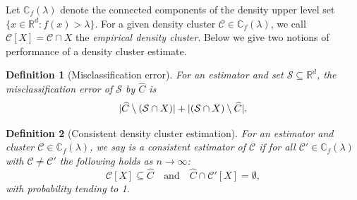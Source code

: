 \documentclass{article}
\DeclarePairedDelimiter\abs{\lvert}{\rvert}
\newcommand{\Reals}{\mathbb{R}}
\newcommand{\Rd}{\Reals^d}
\newcommand{\1}{\mathbf{1}}
\newcommand{\Xbf}{X}             %
\newcommand{\Cbb}{\mathbb{C}}
\newcommand{\Cset}{\mathcal{C}}
\newcommand{\Cest}{\widehat{C}}
\theoremstyle{aldenthm}
\newtheorem{definition}{Definition}
\theoremstyle{aldenrmrk}
\begin{document}



Let $\Cbb_f(\lambda)$ denote the connected components of the density upper level
set $\{x \in \Rd: f(x) > \lambda\}$.  For a given density cluster $\Cset \in
\Cbb_f(\lambda)$, we call $\Cset[\Xbf] = \Cset \cap \Xbf$ the \emph{empirical
density cluster}. Below we give two notions of performance of a density cluster estimate. 

\begin{definition}[Misclassification error]
\label{def: misclassification_rate}
For an estimator \smash{$\Cest \subseteq \Xbf$} and set
$\mathcal{S} \subseteq \Reals^d$, the \emph{misclassification error} of $\mathcal{S}$ by $\Cest$ is
\begin{equation}
\label{eqn: misclassification_rate}
\abs{\Cest \setminus (\mathcal{S} \cap \Xbf)} + \abs{(\mathcal{S} \cap \Xbf) \setminus \Cest}.
\end{equation}
\end{definition}    

\begin{definition}[Consistent density cluster estimation]
\label{def: consistent_density_cluster_estimation}
For an estimator \smash{$\Cest \subseteq \Xbf$} and cluster 
$\Cset \in \Cbb_f(\lambda)$, we say \smash{$\Cest$} is a consistent
estimator of $\Cset$ if for all $\Cset' \in \Cbb_f(\lambda)$ with $\Cset \not=
\Cset'$ the following holds as $n \to \infty$: 
\begin{equation}
\label{eqn: consistent_density_cluster_recovery}
\Cset[\Xbf] \subseteq \Cest \quad \text{and} \quad
\Cest \cap \Cset'[\Xbf] = \emptyset,
\end{equation}
with probability tending to 1.
\end{definition}
\end{document}
